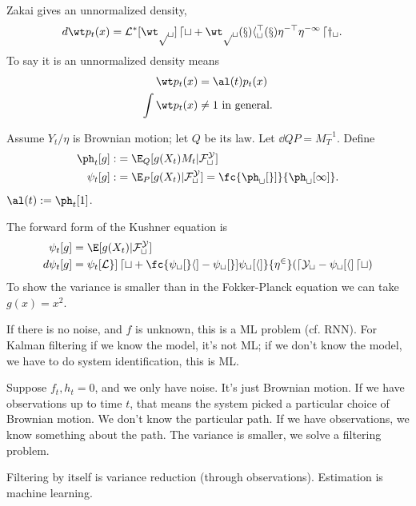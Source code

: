 Zakai gives an unnormalized density,
\begin{align}
d\wt p_t(x) &=\cal L^* [\wt p_t] \,dt + \wt p_t(x) h_t^\top(x)\eta^{-\top}\eta^{-1}\,dy_t.
\end{align}
To say it is an unnormalized density means
\begin{align}
\wt p_t(x) &= \al(t)p_t(x)\\
\int \wt p_t(x) &\ne 1\text{ in general.}
\end{align}
\begin{rem}
Assume $Y_t/\eta$ is Brownian motion; let $Q$ be its law. Let $\dd QP=M_T^{-1}$. Define 
\begin{align}
\ph_t[g]:&=\E_Q[g(X_t)M_t|\cal F_t^Y]\\
\psi_t[g]:&= \E_P[g(X_t)|\cal F_t^Y] = \fc{\ph_t[g]}{\ph_t[1]}.
\end{align}
$\al(t):=\ph_t[1]$. 
\end{rem}

The forward form of the Kushner equation is
\begin{align}
\psi_t[g]&=\E[g(X_t)|\cal F_t^Y]\\
d\psi_t[g] &=\psi_t[\cal L g]\,dt 
+ \fc{\psi_t[gh]-\psi_t[g]\psi_t[h]}{\eta^2} (dY_t-\psi_t[h]\,dt)
\end{align}
To show the variance is smaller than in the Fokker-Planck equation we can take $g(x)=x^2$.

\begin{rem}
If there is no noise, and $f$ is unknown, this is a ML problem (cf. RNN). For Kalman filtering if we know the model, it's not ML; if we don't know the model, we have to do system identification, this is ML. 

Suppose $f_t,h_t=0$, and we only have noise. It's just Brownian motion. If we have observations up to time $t$, that means the system picked a particular choice of Brownian motion. We don't know the particular path. If we have observations, we know something about the path. The variance is smaller, we solve a filtering problem. 

Filtering by itself is variance reduction (through observations). Estimation is machine learning.
\end{rem}

